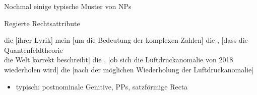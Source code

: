 \begin{frame}
  {Nochmal einige typische Muster von NPs}
  \onslide<+->
  \onslide<+->
 \Halbzeile 
  \begin{center}
  \end{center}
\end{frame}



\begin{frame}
  {Regierte Rechtsattribute}
  \pause
  \begin{exe}
    \ex die  \alert{[ihrer Lyrik]}
    \pause
    \ex mein  \alert{[um die Bedeutung der komplexen Zahlen]}
    \pause
    \ex die , \alert{[dass die Quantenfeldtheorie \\
    die Welt korrekt beschreibt]}
    \pause
    \ex die , \alert{[ob sich die Luftdruckanomalie von 2018 wiederholen wird]}
    \pause
    \ex die  \alert{[nach der möglichen Wiederholung der Luftdruckanomalie]}
  \end{exe}
  \pause
  \Halbzeile
  \begin{itemize}[<+->]
    \item typisch: postnominale Genitive, PPs, satzförmige Recta
  \end{itemize}
\end{frame}


